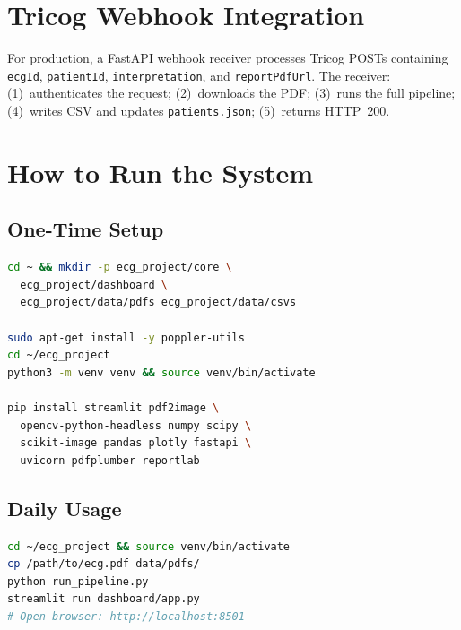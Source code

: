 \documentclass[conference]{IEEEtran}
\begin{document}
\section{Tricog Webhook Integration}

For production, a FastAPI webhook receiver processes Tricog POSTs containing
\texttt{ecgId}, \texttt{patientId}, \texttt{interpretation}, and
\texttt{reportPdfUrl}. The receiver: (1)~authenticates the request;
(2)~downloads the PDF; (3)~runs the full pipeline; (4)~writes CSV and updates
\texttt{patients.json}; (5)~returns HTTP~200.

\section{How to Run the System}

\subsection{One-Time Setup}

\begin{lstlisting}[language=bash, caption={Installation (WSL/Ubuntu)}]
cd ~ && mkdir -p ecg_project/core \
  ecg_project/dashboard \
  ecg_project/data/pdfs ecg_project/data/csvs

sudo apt-get install -y poppler-utils
cd ~/ecg_project
python3 -m venv venv && source venv/bin/activate

pip install streamlit pdf2image \
  opencv-python-headless numpy scipy \
  scikit-image pandas plotly fastapi \
  uvicorn pdfplumber reportlab
\end{lstlisting}

\subsection{Daily Usage}

\begin{lstlisting}[language=bash, caption={Pipeline and dashboard}]
cd ~/ecg_project && source venv/bin/activate
cp /path/to/ecg.pdf data/pdfs/
python run_pipeline.py
streamlit run dashboard/app.py
# Open browser: http://localhost:8501
\end{lstlisting}
\end{document}
